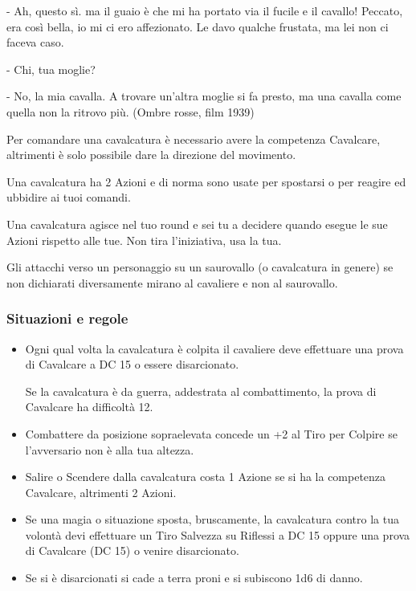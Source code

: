 \begin{multicols}{2}
\begin{enfasi}
{- Ah, questo sì. ma il guaio è che mi ha portato via il fucile e il cavallo! Peccato, era così bella, io mi ci ero affezionato. Le davo qualche frustata, ma lei non ci faceva caso.

- Chi, tua moglie?

- No, la mia cavalla. A trovare un'altra moglie si fa presto, ma una cavalla come quella non la ritrovo più. (Ombre rosse, film 1939)}\end{enfasi}

Per comandare una cavalcatura è necessario avere la competenza Cavalcare, altrimenti è solo possibile dare la direzione del movimento.

Una cavalcatura ha 2 Azioni e di norma sono usate per spostarsi o per reagire ed ubbidire ai tuoi comandi.

Una cavalcatura agisce nel tuo round e sei tu a decidere quando esegue le sue Azioni rispetto alle tue. Non tira l'iniziativa, usa la tua.

Gli attacchi verso un personaggio su un saurovallo (o cavalcatura in genere) se non dichiarati diversamente mirano al cavaliere e non al saurovallo.

\subsubsection{Situazioni e regole}\label{cavallosituazioniregole}

\begin{itemize}[leftmargin=*] \setlength{\itemsep}{0pt}
\item
Ogni qual volta la cavalcatura è colpita il cavaliere deve effettuare una prova di Cavalcare a DC 15 o essere disarcionato.

Se la cavalcatura è da guerra, addestrata al combattimento, la prova di Cavalcare ha difficoltà 12.

\item
Combattere da posizione sopraelevata concede un +2 al Tiro per Colpire se l'avversario non è alla tua altezza.

\item
Salire o Scendere dalla cavalcatura costa 1 Azione se si ha la competenza Cavalcare, altrimenti 2 Azioni.

\item
Se una magia o situazione sposta, bruscamente, la cavalcatura contro la tua volontà devi effettuare un Tiro Salvezza su Riflessi a DC 15 oppure una prova di Cavalcare (DC 15) o venire disarcionato.

\item
Se si è disarcionati si cade a terra proni e si subiscono 1d6 di danno.
\end{itemize}


\end{multicols}
